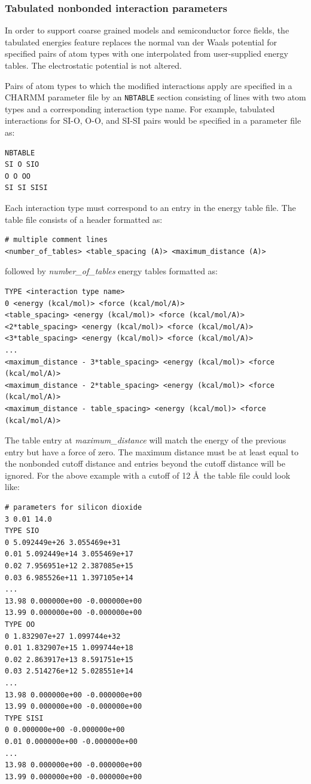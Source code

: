 \subsubsection{Tabulated nonbonded interaction parameters}

In order to support coarse grained models and semiconductor force fields,
the tabulated energies feature replaces the normal van der Waals potential
for specified pairs of atom types with one interpolated from user-supplied
energy tables.  The electrostatic potential is not altered.

Pairs of atom types to which the modified interactions apply are specified
in a CHARMM parameter file by an {\tt NBTABLE} section consisting of lines
with two atom types and a corresponding interaction type name.
For example, tabulated interactions for SI-O, O-O, and SI-SI pairs would
be specified in a parameter file as:
\begin{verbatim}
NBTABLE
SI O SIO
O O OO
SI SI SISI
\end{verbatim}

Each interaction type must correspond to an entry in the energy table file.
The table file consists of a header formatted as:
\begin{verbatim}
# multiple comment lines
<number_of_tables> <table_spacing (A)> <maximum_distance (A)>
\end{verbatim}
followed by {\em number\_of\_tables} energy tables formatted as:
\begin{verbatim}
TYPE <interaction type name>
0 <energy (kcal/mol)> <force (kcal/mol/A)>
<table_spacing> <energy (kcal/mol)> <force (kcal/mol/A)>
<2*table_spacing> <energy (kcal/mol)> <force (kcal/mol/A)>
<3*table_spacing> <energy (kcal/mol)> <force (kcal/mol/A)>
...
<maximum_distance - 3*table_spacing> <energy (kcal/mol)> <force (kcal/mol/A)>
<maximum_distance - 2*table_spacing> <energy (kcal/mol)> <force (kcal/mol/A)>
<maximum_distance - table_spacing> <energy (kcal/mol)> <force (kcal/mol/A)>
\end{verbatim}

The table entry at {\em maximum\_distance} will match the energy of the
previous entry but have a force of zero.  The maximum distance must be at
least equal to the nonbonded cutoff distance and entries beyond the cutoff
distance will be ignored.  For the above example with a cutoff of 12 \AA\
the table file could look like:
\begin{verbatim}
# parameters for silicon dioxide
3 0.01 14.0
TYPE SIO
0 5.092449e+26 3.055469e+31
0.01 5.092449e+14 3.055469e+17
0.02 7.956951e+12 2.387085e+15
0.03 6.985526e+11 1.397105e+14
...
13.98 0.000000e+00 -0.000000e+00
13.99 0.000000e+00 -0.000000e+00
TYPE OO
0 1.832907e+27 1.099744e+32
0.01 1.832907e+15 1.099744e+18
0.02 2.863917e+13 8.591751e+15
0.03 2.514276e+12 5.028551e+14
...
13.98 0.000000e+00 -0.000000e+00
13.99 0.000000e+00 -0.000000e+00
TYPE SISI
0 0.000000e+00 -0.000000e+00
0.01 0.000000e+00 -0.000000e+00
...
13.98 0.000000e+00 -0.000000e+00
13.99 0.000000e+00 -0.000000e+00
\end{verbatim}

